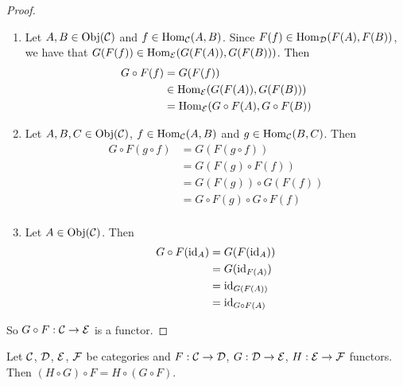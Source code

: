 \documentclass{book}
\begin{document}
	\begin{proof}\
		\begin{enumerate}
			\item Let $A, B \in \operatorname{Obj}(\mathcal{C})$ and $f \in \operatorname{Hom}_{\mathcal{C}}(A,B)$. Since $F(f) \in \operatorname{Hom}_{\mathcal{D}}(F(A), F(B))$, we have that $G(F(f)) \in \operatorname{Hom}_{\mathcal{E}}(G(F(A)), G(F(B)))$. Then 
			\begin{align*}
				G \circ F (f) 
				& = G(F(f)) \\
				& \in \operatorname{Hom}_{\mathcal{E}}(G(F(A)), G(F(B))) \\
				& =  \operatorname{Hom}_{\mathcal{E}}(G \circ F(A), G \circ F (B)) \\
			\end{align*}
			\item Let $A,B, C \in \operatorname{Obj}(\mathcal{C})$, $f \in \operatorname{Hom}_{\mathcal{C}}(A,B)$ and $g \in \operatorname{Hom}_{\mathcal{C}}(B, C)$. Then 
			\begin{align*}
				G \circ F(g \circ f) 
				& = G (F (g \circ f)) \\
				& = G(F(g) \circ F(f)) \\
				& = G(F(g)) \circ G(F(f)) \\
				& = G \circ F (g) \circ G \circ F (f) \\
			\end{align*}
			\item Let $A \in \operatorname{Obj}(\mathcal{C})$. Then 
			\begin{align*}
				G \circ F(\operatorname{id}_{A})
				& = G(F(\operatorname{id}_A) )\\
				& = G(\operatorname{id}_{F(A)}) \\
				& = \operatorname{id}_{G(F(A))} \\
				& = \operatorname{id}_{G \circ F(A)} 
			\end{align*}
		\end{enumerate}
		So $G \circ F: \mathcal{C} \rightarrow \mathcal{E}$ is a functor. 
	\end{proof}
	
	\begin{ex} 
		Let $\mathcal{C}$, $\mathcal{D}$, $\mathcal{E}$, $\mathcal{F}$ be categories and $F:\mathcal{C} \rightarrow \mathcal{D}$, $G : \mathcal{D} \rightarrow \mathcal{E}$, $H: \mathcal{E} \rightarrow \mathcal{F}$ functors. Then $(H \circ G) \circ F = H \circ (G \circ F)$.
	\end{ex}
	
\end{document}
